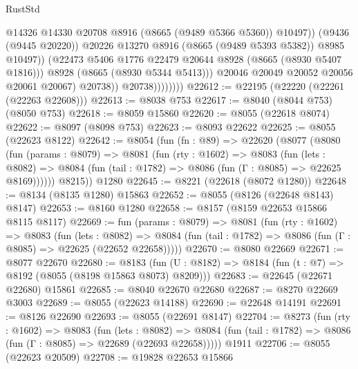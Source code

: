 \begin{lexlean}{RustStd}
\begin{coremodule}
                                    @14326
                                    @14330
                                    @20708
                                    @8916
                                    (@8665 (@9489 @5366 @5360))
                                    @10497))
                                (@9436 (@9445 @20220))
                                @20226
                                @13270
                                @8916
                                (@8665 (@9489 @5393 @5382))
                                @8985
                                @10497))
                            (@22473 @5406 @1776 @22479 @20644 @8928 (@8665 (@8930 @5407 @1816)))
                            @8928
                            (@8665 (@8930 @5344 @5413)))
                          @20046
                          @20049
                          @20052
                          @20056
                          @20061
                          @20067)
                        @20738))
                    @20738))))))))
@22612 := @22195 (@22220 (@22261 (@22263 @22608)))
@22613 := @8038 @753
@22617 := @8040 (@8044 @753) (@8050 @753)
@22618 := @8059 @15860
@22620 := @8055 (@22618 @8074)
@22622 := @8097 (@8098 @753)
@22623 := @8093 @22622
@22625 := @8055 (@22623 @8122)
@22642 := @8054
    (fun (fn : @89) =>
    @22620
      (@8077
        (@8080
          (fun (params : @8079) =>
          @8081
            (fun (rty : @1602) =>
            @8083
              (fun (lets : @8082) =>
              @8084 (fun (tail : @1782) => @8086 (fun (Γ : @8085) => @22625 @8169))))))
        @8215))
    @1280
@22645 := @8221 (@22618 (@8072 @1280))
@22648 := @8134 (@8135 @1280) @15863
@22652 := @8055 (@8126 (@22648 @8143) @8147)
@22653 := @8160 @1280
@22658 := @8157 (@8159 @22653 @15866 @8115 @8117)
@22669 := fun (params : @8079) =>
  @8081
    (fun (rty : @1602) =>
    @8083
      (fun (lets : @8082) =>
      @8084 (fun (tail : @1782) => @8086 (fun (Γ : @8085) => @22625 (@22652 @22658)))))
@22670 := @8080 @22669
@22671 := @8077 @22670
@22680 := @8183
    (fun (U : @8182) => @8184 (fun (t : @7) => @8192 (@8055 (@8198 @15863 @8073) @8209)))
@22683 := @22645 (@22671 @22680) @15861
@22685 := @8040 @22670 @22680
@22687 := @8270 @22669 @3003
@22689 := @8055 (@22623 @14188)
@22690 := @22648 @14191
@22691 := @8126 @22690
@22693 := @8055 (@22691 @8147)
@22704 := @8273
    (fun (rty : @1602) =>
    @8083
      (fun (lets : @8082) =>
      @8084 (fun (tail : @1782) => @8086 (fun (Γ : @8085) => @22689 (@22693 @22658)))))
    @1911
@22706 := @8055 (@22623 @20509)
@22708 := @19828 @22653 @15866

\end{coremodule}
\end{lexlean}

